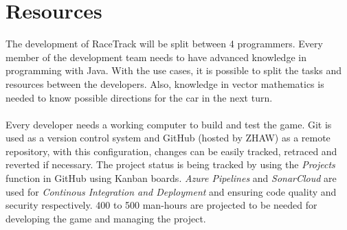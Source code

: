 \section{Resources}
	The development of RaceTrack will be split between 4 programmers. Every member of the development team needs to have advanced knowledge in programming with Java. With the use cases, it is possible to split the tasks and resources between the developers. Also, knowledge in vector mathematics is needed to know possible directions for the car in the next turn.
	\\~\\
	Every developer needs a working computer to build and test the game. Git is used as a version control system and GitHub (hosted by ZHAW) as a remote repository, with this configuration, changes can be easily tracked, retraced and reverted if necessary. The project status is being tracked by using the \textit{Projects} function in GitHub using \gls{Kanban} boards. \textit{\gls{Azure Pipelines}} and \textit{\gls{SonarCloud}} are used for \textit{\gls{Continous Integration and Deployment}} and ensuring code quality and security respectively. 400 to 500 man-hours are projected to be needed for developing the game and managing the project.